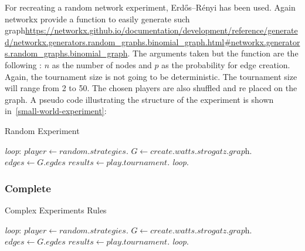 For recreating a random network experiment, Erdős–Rényi has been used.
Again networkx provide a function to easily generate such graph\url{https://networkx.github.io/documentation/development/reference/generated/networkx.generators.random_graphs.binomial_graph.html#networkx.generators.random_graphs.binomial_graph}.
The arguments taken but the function are the following : \(n\) as the number
of nodes and \(p\) as the probability for edge creation. Again, the tournament
size is not going to be deterministic. The tournament size will range from 2 to 50.
The chosen players are also shuffled and re placed on the graph.
A pseudo code illustrating the structure of the experiment is shown in~\ref{small-world-experiment}:

\begin{algorithm}
  \caption{Random Experiment}\label{simple-experiment-rules}
  \begin{algorithmic}
  \BState \emph{loop}:
  \State $player \gets \textit{random.strategies}$.
  \State $G \gets \textit{create.watts.strogatz.graph}$.
  \State $edges \gets \textit{G.egdes}$
  \State $results \gets \textit{play.tournament}$.
  \emph{loop}.
  \EndFor
  \EndFor
  \EndFor
  \EndProcedure
  \end{algorithmic}
\end{algorithm}

\subsubsection{Complete}
\begin{algorithm}
  \caption{Complex Experiments Rules}\label{simple-experiment-rules}
  \begin{algorithmic}
  \BState \emph{loop}:
  \State $player \gets \textit{random.strategies}$.
  \State $G \gets \textit{create.watts.strogatz.graph}$.
  \State $edges \gets \textit{G.egdes}$
  \State $results \gets \textit{play.tournament}$.
  \emph{loop}.
  \EndFor
  \EndFor
  \EndFor
  \EndProcedure
  \end{algorithmic}
\end{algorithm}



